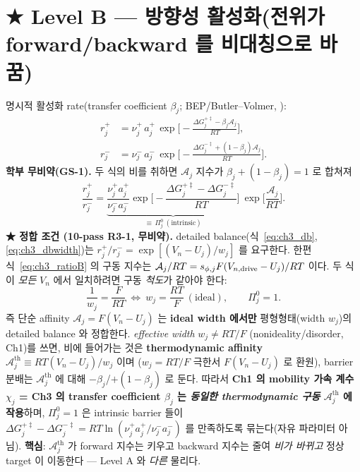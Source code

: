 \section{★ Level B — 방향성 활성화(전위가 forward/backward 를 비대칭으로 바꿈)}\label{sec:ch3_levelB}
명시적 활성화 rate(transfer coefficient $\beta_j$; BEP/Butler--Volmer, ):
\begin{align}
r_j^+&=\nu_j^+\,a_j^+\,\exp\!\Big[-\frac{\Delta G_j^{+\ddagger}-\beta_j\mathcal A_j}{RT}\Big],
\label{eq:ch3_rplus}\\
r_j^-&=\nu_j^-\,a_j^-\,\exp\!\Big[-\frac{\Delta G_j^{-\ddagger}+(1-\beta_j)\mathcal A_j}{RT}\Big].
\label{eq:ch3_rminus}
\end{align}
\textbf{학부 무비약(GS-1).} 두 식의 비를 취하면 $\mathcal A_j$ 지수가 $\beta_j+(1-\beta_j)=1$ 로 합쳐져
\begin{equation}
\frac{r_j^+}{r_j^-}=\underbrace{\frac{\nu_j^+a_j^+}{\nu_j^-a_j^-}\exp\!\Big[-\frac{\Delta G_j^{+\ddagger}-\Delta G_j^{-\ddagger}}{RT}\Big]}_{\textstyle \equiv\,\Pi_j^0\ (\text{intrinsic})}\ \exp\!\Big[\frac{\mathcal A_j}{RT}\Big].
\label{eq:ch3_ratioB}
\end{equation}
\textbf{★ 정합 조건 (10-pass R3-1, 무비약).} detailed balance(식~\eqref{eq:ch3_db},\eqref{eq:ch3_dbwidth})는
$r_j^+/r_j^-=\exp[(V_n-U_j)/w_j]$ 를 요구한다. 한편 식~\eqref{eq:ch3_ratioB} 의 구동 지수는
$\mathcal A_j/RT=s_{\phi,j}F(V_{n,\mathrm{drive}}-U_j)/RT$ 이다. 두 식이 \emph{모든} $V_n$ 에서 일치하려면
구동 \emph{척도}가 같아야 한다:
\begin{equation}
\frac{1}{w_j}=\frac{F}{RT}\ \Longleftrightarrow\ w_j=\frac{RT}{F}\ (\text{ideal}),\qquad \Pi_j^0=1.
\label{eq:ch3_dbconsist}
\end{equation}
즉 단순 affinity $\mathcal A_j=F(V_n-U_j)$ 는 \textbf{ideal width 에서만} 평형형태(width $w_j$)의 detailed
balance 와 정합한다. \emph{effective width} $w_j\ne RT/F$ (nonideality/disorder, Ch1)를 쓰면, 비에
들어가는 것은 \textbf{thermodynamic affinity} $\mathcal A_j^{\mathrm{th}}\equiv RT(V_n-U_j)/w_j$ 이며
($w_j=RT/F$ 극한서 $F(V_n-U_j)$ 로 환원), barrier 분배는 $\mathcal A_j^{\mathrm{th}}$ 에 대해
$-\beta_j$/$+(1-\beta_j)$ 로 둔다. 따라서 \textbf{Ch1 의 mobility 가속 계수 $\chi_j$ = Ch3 의
transfer coefficient $\beta_j$ 는 \emph{동일한 thermodynamic 구동} $\mathcal A_j^{\mathrm{th}}$ 에 작용}하며,
$\Pi_j^0=1$ 은 intrinsic barrier 들이 $\Delta G_j^{+\ddagger}-\Delta G_j^{-\ddagger}=RT\ln(\nu_j^+a_j^+/\nu_j^-a_j^-)$
를 만족하도록 묶는다(자유 파라미터 아님). \textbf{핵심}: $\mathcal A_j^{\mathrm{th}}$ 가 forward 지수는
키우고 backward 지수는 줄여 \emph{비가 바뀌고} 정상 target 이 이동한다 — Level A 와 \emph{다른} 물리다.

